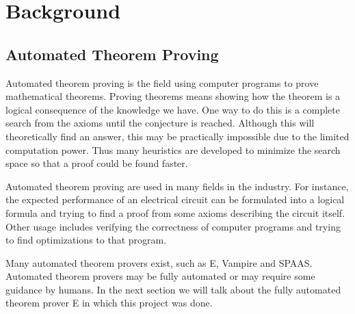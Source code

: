 \chapter{Background}\label{chap:background}

\section{Automated Theorem Proving}
Automated theorem proving is the field using computer programs to prove mathematical theorems. Proving theorems means showing how the theorem is a logical consequence of the knowledge we have. One way to do this is a complete search from the axioms until the conjecture is reached. Although this will theoretically find an answer, this may be practically impossible due to the limited computation power. Thus many heuristics are developed to minimize the search space so that a proof could be found faster.

Automated theorem proving are used in many fields in the industry. For instance, the expected performance of an electrical circuit can be formulated into a logical formula and trying to find a proof from some axioms describing the circuit itself. Other usage includes verifying the correctness of computer programs and trying to find optimizations to that program.

Many automated theorem provers exist, such as E, Vampire and SPAAS. Automated theorem provers may be fully automated or may require some guidance by humans. In the next section we will talk about the fully automated theorem prover E in which this project was done.

